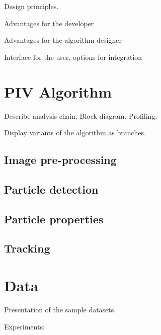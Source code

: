 Design principles.



Advantages for the developer



Advantages for the algorithm designer



Interface for the user, options for integration





\section{PIV Algorithm}



Describe analysis chain. Block diagram. Profiling.

Display variants of the algorithm as branches.





\subsection{Image pre-processing}



\subsection{Particle detection}



\subsection{Particle properties}



\subsection{Tracking}





\section{Data}



Presentation of the sample datasets. 



Experiments:

